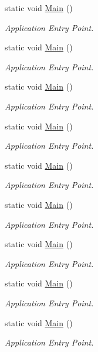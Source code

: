\begin{DoxyCompactItemize}
\item 
static void \mbox{\hyperlink{classprojekt_1_1_app_aa099f0b6d877e4097ec4cbc0f99826ae}{Main}} ()
\begin{DoxyCompactList}\small\item\em Application Entry Point. \end{DoxyCompactList}\item 
static void \mbox{\hyperlink{classprojekt_1_1_app_aa099f0b6d877e4097ec4cbc0f99826ae}{Main}} ()
\begin{DoxyCompactList}\small\item\em Application Entry Point. \end{DoxyCompactList}\item 
static void \mbox{\hyperlink{classprojekt_1_1_app_aa099f0b6d877e4097ec4cbc0f99826ae}{Main}} ()
\begin{DoxyCompactList}\small\item\em Application Entry Point. \end{DoxyCompactList}\item 
static void \mbox{\hyperlink{classprojekt_1_1_app_aa099f0b6d877e4097ec4cbc0f99826ae}{Main}} ()
\begin{DoxyCompactList}\small\item\em Application Entry Point. \end{DoxyCompactList}\item 
static void \mbox{\hyperlink{classprojekt_1_1_app_aa099f0b6d877e4097ec4cbc0f99826ae}{Main}} ()
\begin{DoxyCompactList}\small\item\em Application Entry Point. \end{DoxyCompactList}\item 
static void \mbox{\hyperlink{classprojekt_1_1_app_aa099f0b6d877e4097ec4cbc0f99826ae}{Main}} ()
\begin{DoxyCompactList}\small\item\em Application Entry Point. \end{DoxyCompactList}\item 
static void \mbox{\hyperlink{classprojekt_1_1_app_aa099f0b6d877e4097ec4cbc0f99826ae}{Main}} ()
\begin{DoxyCompactList}\small\item\em Application Entry Point. \end{DoxyCompactList}\item 
static void \mbox{\hyperlink{classprojekt_1_1_app_aa099f0b6d877e4097ec4cbc0f99826ae}{Main}} ()
\begin{DoxyCompactList}\small\item\em Application Entry Point. \end{DoxyCompactList}\item 
static void \mbox{\hyperlink{classprojekt_1_1_app_aa099f0b6d877e4097ec4cbc0f99826ae}{Main}} ()
\begin{DoxyCompactList}\small\item\em Application Entry Point. \end{DoxyCompactList}\end{DoxyCompactItemize}


